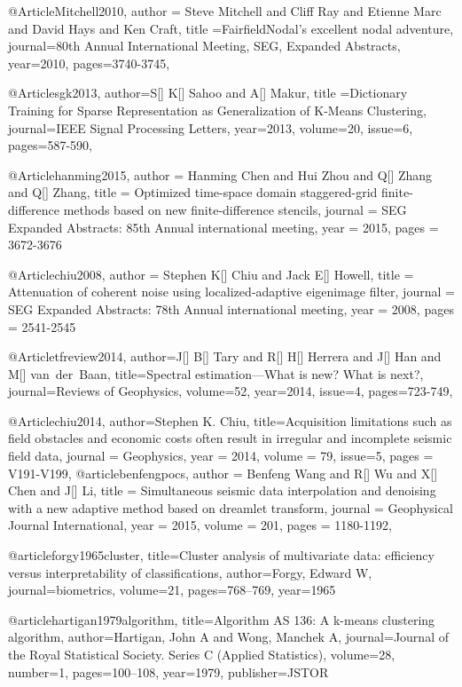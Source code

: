 @Article{Mitchell2010,
  author = {Steve Mitchell and Cliff Ray and Etienne Marc and David Hays and Ken Craft},
  title ={FairfieldNodal's excellent nodal adventure},
  journal={80th Annual International Meeting, SEG, Expanded Abstracts},
  year=2010,
  pages={3740-3745},
}

@Article{sgk2013,
  author={S[] K[] Sahoo and A[] Makur},
  title ={Dictionary Training	for	Sparse Representation as Generalization	of K-Means Clustering},
  journal={IEEE Signal Processing Letters},
  year=2013,
  volume=20,
  issue=6,
  pages={587-590},
}


@Article{hanming2015,
  author = 	 {Hanming Chen and Hui Zhou and Q[] Zhang and Q[] Zhang},
  title = 	 {Optimized time-space domain staggered-grid finite-difference methods based on new finite-difference stencils},
  journal = 	 {SEG Expanded Abstracts: 85th Annual international meeting},
  year = 	 2015,
  pages =	 {3672-3676}
}

@Article{chiu2008,
  author = 	 {Stephen K[] Chiu and Jack E[] Howell},
  title = 	 {Attenuation of coherent noise using localized‐adaptive eigenimage filter},
  journal = 	 {SEG Expanded Abstracts: 78th Annual international meeting},
  year = 	 2008,
  pages =	 {2541-2545}
}



@Article{tfreview2014,
author={J[] B[] Tary and R[] H[] Herrera and J[] Han and M[] van~der~Baan},
title={Spectral estimation—What is new? What is next?},
journal={Reviews of Geophysics},
volume=52,
year=2014,
issue=4,
pages={723-749},
}

@Article{chiu2014,
  author={Stephen K. Chiu},
  title={Acquisition limitations such as field obstacles and economic costs often result in irregular and incomplete seismic field data},
  journal = 	 {Geophysics},
  year = 	 2014,
  volume =	 79,
  issue=5,
  pages =	 {V191-V199},
}
@article{benfengpocs,
  author =	 {Benfeng Wang and R[] Wu and X[] Chen and J[] Li},
  title =	 {Simultaneous seismic data interpolation and denoising with a new adaptive method based on dreamlet transform},
  journal = 	 {Geophysical Journal International},
  year = 	 2015,
  volume =	 201,
  pages =	 {1180-1192},
}


@article{forgy1965cluster,
  title={Cluster analysis of multivariate data: efficiency versus interpretability of classifications},
  author={Forgy, Edward W},
  journal={biometrics},
  volume={21},
  pages={768--769},
  year={1965}
}

@article{hartigan1979algorithm,
  title={Algorithm AS 136: A k-means clustering algorithm},
  author={Hartigan, John A and Wong, Manchek A},
  journal={Journal of the Royal Statistical Society. Series C (Applied Statistics)},
  volume={28},
  number={1},
  pages={100--108},
  year={1979},
  publisher={JSTOR}
}

